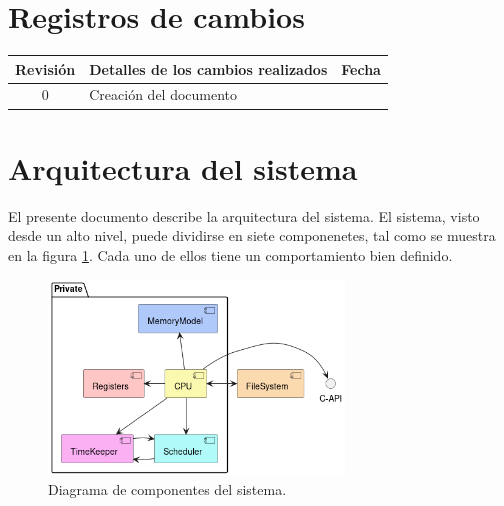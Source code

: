 \documentclass[
  11pt, %
  codirector, %
]{charter}
\begin{document}
\maketitle
\tableofcontents

\newpage

\section*{Registros de cambios}
\label{sec:registro}


\begin{table}[ht]
	\label{tab:registro}
	\centering
	\begin{tabularx}{\linewidth}{@{}|c|X|c|@{}}
		\hline
		\rowcolor[HTML]{C0C0C0}
		Revisión & \multicolumn{1}{c|}{\cellcolor[HTML]{C0C0C0}Detalles de los cambios realizados} & Fecha      \\ \hline
		0      & Creación del documento                                 &\fechaInicioName \\ \hline
		\hline

	\end{tabularx}
	\label{sec:cierre}
\end{table}

\pagebreak


\section{Arquitectura del sistema}
\label{sec:org60390fa}

El presente documento describe la arquitectura del sistema. El sistema, visto desde un alto nivel, puede dividirse en siete componenetes, tal como se muestra en la figura \ref{fig:Arquitectura}. Cada uno de ellos tiene un comportamiento bien definido.

\begin{figure}[htpb]
  \centering
  \includegraphics[width=0.7\textwidth]{./Figuras/components.png}
  \caption{Diagrama de componentes del sistema.}
  \label{fig:Arquitectura}
\end{figure}
\end{document}
